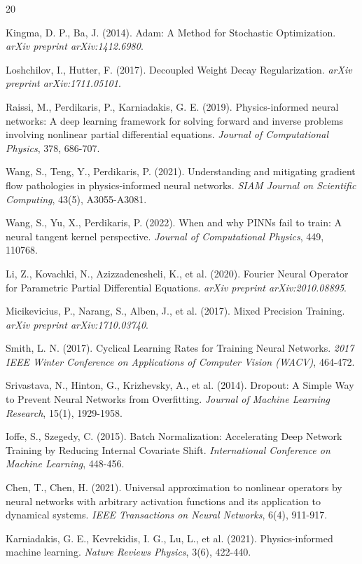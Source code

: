 \begin{thebibliography}{20}

Kingma, D. P., Ba, J. (2014).  
Adam: A Method for Stochastic Optimization.  
\textit{arXiv preprint arXiv:1412.6980}.

Loshchilov, I., Hutter, F. (2017).  
Decoupled Weight Decay Regularization.  
\textit{arXiv preprint arXiv:1711.05101}.

Raissi, M., Perdikaris, P., Karniadakis, G. E. (2019).  
Physics-informed neural networks: A deep learning framework for solving forward and inverse problems involving nonlinear partial differential equations.  
\textit{Journal of Computational Physics}, 378, 686-707.

Wang, S., Teng, Y., Perdikaris, P. (2021).  
Understanding and mitigating gradient flow pathologies in physics-informed neural networks.  
\textit{SIAM Journal on Scientific Computing}, 43(5), A3055-A3081.

Wang, S., Yu, X., Perdikaris, P. (2022).  
When and why PINNs fail to train: A neural tangent kernel perspective.  
\textit{Journal of Computational Physics}, 449, 110768.

Li, Z., Kovachki, N., Azizzadenesheli, K., et al. (2020).  
Fourier Neural Operator for Parametric Partial Differential Equations.  
\textit{arXiv preprint arXiv:2010.08895}.

Micikevicius, P., Narang, S., Alben, J., et al. (2017).  
Mixed Precision Training.  
\textit{arXiv preprint arXiv:1710.03740}.

Smith, L. N. (2017).  
Cyclical Learning Rates for Training Neural Networks.  
\textit{2017 IEEE Winter Conference on Applications of Computer Vision (WACV)}, 464-472.

Srivastava, N., Hinton, G., Krizhevsky, A., et al. (2014).  
Dropout: A Simple Way to Prevent Neural Networks from Overfitting.  
\textit{Journal of Machine Learning Research}, 15(1), 1929-1958.

Ioffe, S., Szegedy, C. (2015).  
Batch Normalization: Accelerating Deep Network Training by Reducing Internal Covariate Shift.  
\textit{International Conference on Machine Learning}, 448-456.

Chen, T., Chen, H. (2021).  
Universal approximation to nonlinear operators by neural networks with arbitrary activation functions and its application to dynamical systems.  
\textit{IEEE Transactions on Neural Networks}, 6(4), 911-917.

Karniadakis, G. E., Kevrekidis, I. G., Lu, L., et al. (2021).  
Physics-informed machine learning.  
\textit{Nature Reviews Physics}, 3(6), 422-440.

\end{thebibliography}

